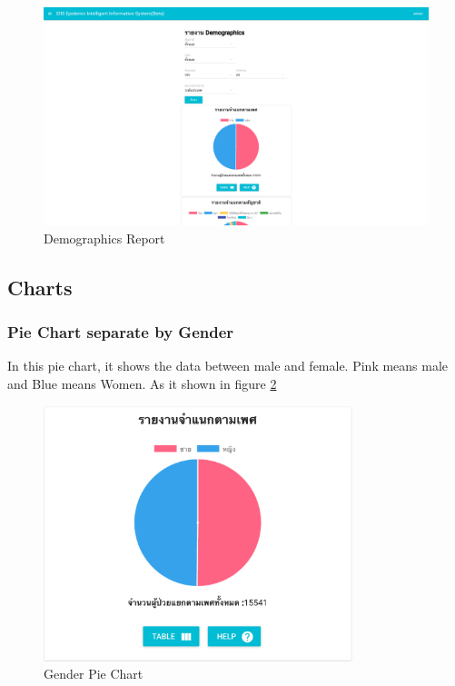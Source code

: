     \FloatBarrier
    	\begin{figure}[h!]
            \centering
        		\includegraphics[width=12cm]{images/chapter-05/demographics-report.png}
        		\caption{Demographics Report}
        		\label{demographics-report}
        \end{figure}
	\FloatBarrier
	
	\subsection{Charts} \label{chart}
	   	 
	
    	\subsubsection{Pie Chart separate by Gender}
    	    In this pie chart, it shows the data between male and female. Pink means male and Blue means Women. As it shown in figure \ref{pie-graph-sex}
    	    \vspace{10mm}
        	\FloatBarrier
            	\begin{figure}[h!]
                    \centering
                		\includegraphics[width=9cm]{images/chapter-05/pie-graph-sex.png}
                		\caption{Gender Pie Chart}
                		\label{pie-graph-sex}
                \end{figure}
        	\FloatBarrier
    	\newpage
